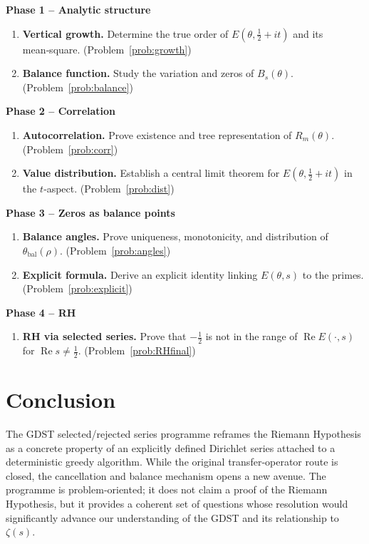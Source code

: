 \documentclass[11pt,a4paper]{article}
\theoremstyle{definition}
\theoremstyle{remark}
\begin{document}
\noindent\textbf{Phase 1 -- Analytic structure}
\begin{enumerate}[label=\textbf{A\arabic*},leftmargin=*,resume]
\item \textbf{Vertical growth.} Determine the true order of \(E(\theta,\frac12+it)\) and its mean‑square. \hfill (Problem~\ref{prob:growth})
\item \textbf{Balance function.} Study the variation and zeros of \(B_s(\theta)\). \hfill (Problem~\ref{prob:balance})
\end{enumerate}

\noindent\textbf{Phase 2 -- Correlation}
\begin{enumerate}[label=\textbf{C\arabic*},leftmargin=*,resume]
\item \textbf{Autocorrelation.} Prove existence and tree representation of \(R_m(\theta)\). \hfill (Problem~\ref{prob:corr})
\item \textbf{Value distribution.} Establish a central limit theorem for \(E(\theta,\frac12+it)\) in the \(t\)‑aspect. \hfill (Problem~\ref{prob:dist})
\end{enumerate}

\noindent\textbf{Phase 3 -- Zeros as balance points}
\begin{enumerate}[label=\textbf{Z\arabic*},leftmargin=*,resume]
\item \textbf{Balance angles.} Prove uniqueness, monotonicity, and distribution of \(\theta_{\mathrm{bal}}(\rho)\). \hfill (Problem~\ref{prob:angles})
\item \textbf{Explicit formula.} Derive an explicit identity linking \(E(\theta,s)\) to the primes. \hfill (Problem~\ref{prob:explicit})
\end{enumerate}

\noindent\textbf{Phase 4 -- RH}
\begin{enumerate}[label=\textbf{R\arabic*},leftmargin=*,resume]
\item \textbf{RH via selected series.} Prove that \(-\tfrac12\) is not in the range of \(\operatorname{Re}E(\cdot,s)\) for \(\operatorname{Re}s\neq\tfrac12\). \hfill (Problem~\ref{prob:RHfinal})
\end{enumerate}

\section{Conclusion}
The GDST selected/rejected series programme reframes the Riemann Hypothesis as a concrete property of an explicitly defined Dirichlet series attached to a deterministic greedy algorithm.
While the original transfer‑operator route is closed, the cancellation and balance mechanism opens a new avenue.
The programme is problem‑oriented; it does not claim a proof of the Riemann Hypothesis, but it provides a coherent set of questions whose resolution would significantly advance our understanding of the GDST and its relationship to \(\zeta(s)\).
\end{document}
